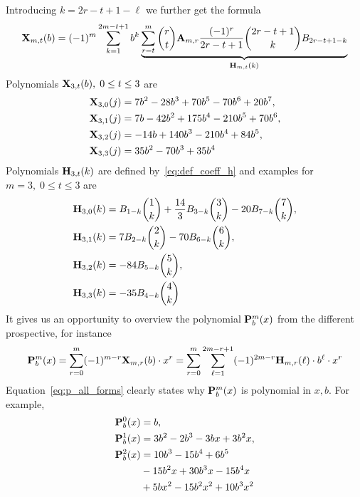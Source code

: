 Introducing $k=2r-t+1-\ell$ we further get the formula
\begin{equation*}
    {\mathbf{X}}\sb{m,t} (b) = (-1)^m \sum_{k=1}^{2m-t+1} b^k
    \underbrace{\sum_{r=t}^m \binom{r}{t} {\mathbf{A}} \sb{m,r} \frac{(-1)^r}{2r-t+1} \binom{2r-t+1}{k}
    {B}\sb{2r-t+1-k}}_{{\mathbf{H}} \sb{m,t} (k)}
\end{equation*}
Polynomials ${\mathbf{X}}\sb{3,t} (b), \; 0\leq t \leq 3$ are
\begin{equation*}
    \begin{split}
        {\mathbf{X}}\sb{3,0} (j)
        &=7 b^2 - 28 b^3 + 70 b^5 - 70 b^6 + 20 b^7, \\
        {\mathbf{X}}\sb{3,1} (j)
        &=7 b - 42 b^2 + 175 b^4 - 210 b^5 + 70 b^6, \\
        {\mathbf{X}}\sb{3,2} (j)
        &=-14 b + 140 b^3 - 210 b^4 + 84 b^5, \\
        {\mathbf{X}}\sb{3,3} (j)
        &=35 b^2 - 70 b^3 + 35 b^4
    \end{split}
\end{equation*}
Polynomials ${\mathbf{H}} \sb{3,t} (k)$ are defined by~\eqref{eq:def_coeff_h} and examples for $m=3, \; 0\leq t \leq 3$ are
\begin{equation*}
    \begin{split}
        {\mathbf{H}} \sb{3,0} (k)
        &={B}\sb{1-k} \binom{1}{k} + \frac{14}{3} {B}\sb{3-k} \binom{3}{k} - 20 {B}\sb{7 - k} \binom{7}{k}, \\
        {\mathbf{H}} \sb{3,1} (k)
        &=7 {B}\sb{2-k} \binom{2}{k} - 70 {B}\sb{6-k} \binom{6}{k}, \\
        {\mathbf{H}} \sb{3,2} (k)
        &=-84 {B}\sb{5-k} \binom{5}{k}, \\
        {\mathbf{H}} \sb{3,3} (k)
        &=-35 {B}\sb{4-k} \binom{4}{k}
    \end{split}
\end{equation*}
It gives us an opportunity to overview the polynomial ${\mathbf{P}}\sp{m} \sb{b}(x)$ from the different prospective,
for instance
\begin{equation}
    \label{eq:p_all_forms}
    {\mathbf{P}}\sp{m} \sb{b}(x)
    =\sum_{r=0}^{m} (-1)^{m-r} {\mathbf{X}}\sb{m,r} (b) \cdot x^r
    =\sum_{r=0}^{m} \sum_{\ell=1}^{2m-r+1} (-1)^{2m-r} {\mathbf{H}} \sb{m,r} (\ell) \cdot b^\ell \cdot x^r
\end{equation}
Equation~\eqref{eq:p_all_forms} clearly states why ${\mathbf{P}}\sp{m} \sb{b}(x)$ is polynomial in $x,b$.
For example,
\begin{equation*}
    \begin{split}
        {\mathbf{P}}\sp{0} \sb{b}(x)
        &=b, \\
        {\mathbf{P}}\sp{1} \sb{b}(x)
        &=3 b^2 - 2 b^3 - 3 b x + 3 b^2 x, \\
        {\mathbf{P}}\sp{2} \sb{b}(x)
        &=10 b^3 - 15 b^4 + 6 b^5 \\
        &- 15 b^2 x + 30 b^3 x - 15 b^4 x \\
        &+ 5 b x^2 - 15 b^2 x^2 + 10 b^3 x^2
    \end{split}
\end{equation*}
